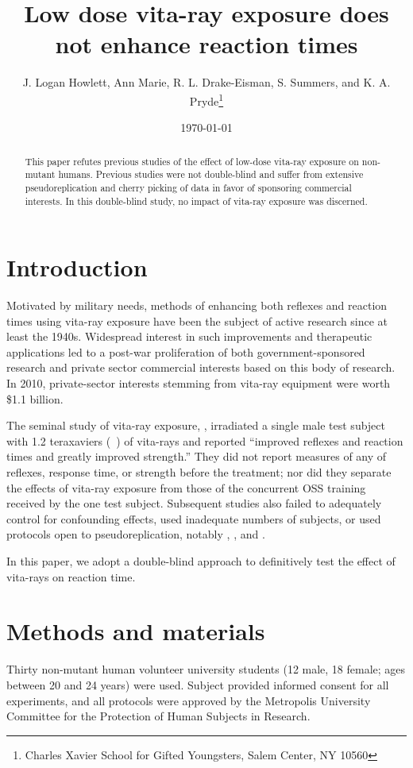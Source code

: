 \documentclass [twocolumn]{article}
\title{Low dose vita-ray exposure does not enhance reaction times}
\author{J. Logan Howlett, Ann Marie, R. L. Drake-Eisman, S. Summers, and K. A. Pryde\thanks{Charles Xavier School for Gifted Youngsters, Salem Center, NY 10560}}
\date{\today}
\begin{document}
\maketitle

\begin{abstract}
This paper refutes previous studies of the effect of low-dose vita-ray exposure on non-mutant humans.  Previous studies were not double-blind and suffer from extensive pseudoreplication and cherry picking of data in favor of sponsoring commercial interests.  In this double-blind study, no impact of vita-ray exposure was discerned. 
\end{abstract}

\maketitle

\section{Introduction}
Motivated by military needs, methods of enhancing both reflexes and reaction times using vita-ray exposure have been the subject of active research since at least the 1940s.  Widespread interest in such improvements and therapeutic applications led to a post-war proliferation of both government-sponsored research and private sector commercial interests based on this body of research.  In 2010, private-sector interests stemming from vita-ray equipment were worth \$1.1 billion.  

The seminal study of vita-ray exposure, \citet{lensherr1941enhancement}, irradiated a single male test subject with 1.2 teraxaviers (\si{\tera\xavier}) of vita-rays and reported “improved reflexes and reaction times and greatly improved strength.”  They did not report measures of any of reflexes, response time, or strength before the treatment; nor did they separate the effects of vita-ray exposure from those of the concurrent OSS training received by the one test subject.  Subsequent studies also failed to adequately control for confounding effects, used inadequate numbers of subjects, or used protocols open to pseudoreplication, notably \citet{luthor1952vitaray}, \citet{cobblepot1964riddle}, and \citet{kyle1975efficacy}.  

In this paper, we adopt a double-blind approach to definitively test the effect of vita-rays on reaction time.  

\section{Methods and materials}
Thirty non-mutant human volunteer university students (12 male, 18 female; ages between 20 and 24 years) were used.  Subject provided informed consent for all experiments, and all protocols were approved by the Metropolis University Committee for the Protection of Human Subjects in Research.  
\end{document}
